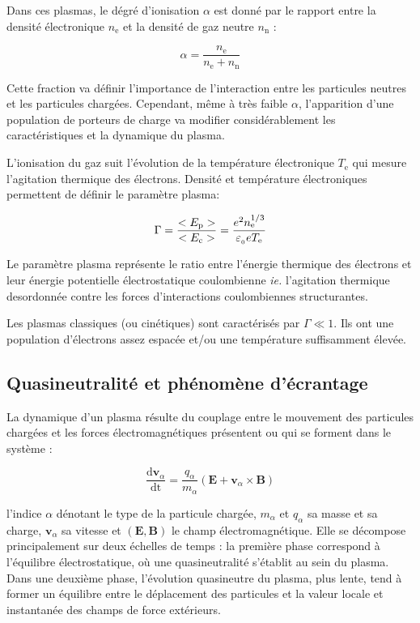 \begin{refsection}
Dans ces plasmas, le dégré d'ionisation $\alpha$ est donné par le rapport
entre la densité électronique $n_\text{e}$ et la densité de gaz neutre
$n_\text{n}$ :

\begin{equation}
\alpha=\frac{n_\text{e}}{n_\text{e}+n_\text{n}}
\end{equation}

Cette fraction va définir l'importance de l'interaction entre les particules
neutres et les particules chargées. Cependant, même à très faible $\alpha$,
l'apparition d'une population de porteurs de charge va modifier considérablement 
les caractéristiques et la dynamique du plasma.

L'ionisation du gaz suit l'évolution de la température électronique $T_\text{e}$
qui mesure l'agitation thermique des électrons. Densité et température
électroniques permettent de définir le paramètre plasma:

\begin{equation}
\label{1-paramPlasma}
\Gamma=\frac{<E_\text{p}>}{<E_\text{c}>}=\frac{e^{{2}}
n_\text{e}^{{1/3}}}{\varepsilon_{_{0}} eT_\text{e}}
\end{equation}

Le paramètre plasma représente le ratio entre l'énergie thermique des
électrons et leur énergie potentielle électrostatique coulombienne \emph{ie.}
l'agitation thermique desordonnée contre les forces d'interactions
coulombiennes structurantes.

Les plasmas classiques (ou cinétiques) sont caractérisés par
$\Gamma\ll 1$. Ils ont une population d'électrons assez espacée et/ou une
température suffisamment élevée.

\subsection{Quasineutralité et phénomène d'écrantage}
La dynamique d'un plasma résulte du couplage entre le mouvement des
particules chargées et les forces électromagnétiques présentent ou qui se
forment dans le système :

\begin{equation}
\frac{\text{d} \mathbf
v_\alpha}{\text{dt}}=\frac{q_\alpha}{m_\alpha}(\mathbf E+ \mathbf
v_\alpha\times\mathbf B)
\end{equation}

l'indice $\alpha$ dénotant le type de la particule chargée, $m_\alpha$
et $q_\alpha$ sa masse et sa charge, $\mathbf v_\alpha$ sa vitesse et $(\mathbf
E,\mathbf B)$ le champ électromagnétique.
Elle se décompose principalement sur deux échelles de temps :
la première phase correspond à l'équilibre électrostatique, où une
quasineutralité s'établit au sein du plasma. Dans une deuxième phase, l'évolution quasineutre du
plasma, plus lente, tend à former un équilibre entre le déplacement des particules et la valeur locale
et instantanée des champs de force extérieurs.


\end{refsection}
